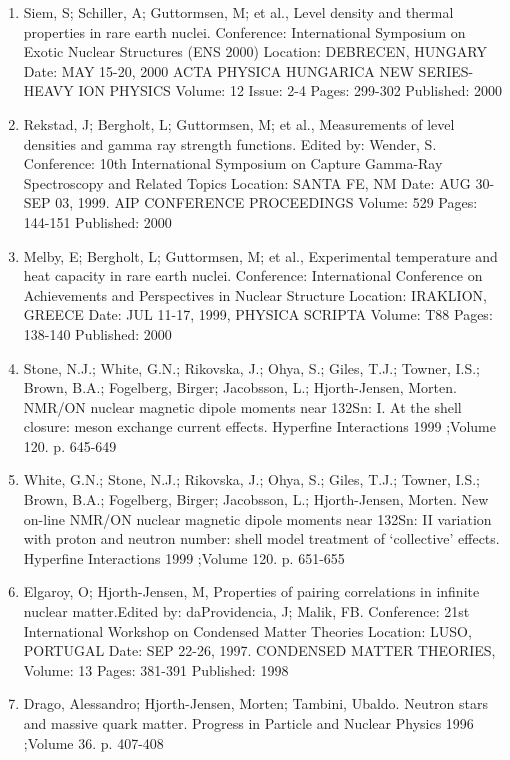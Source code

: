 \documentclass[a4wide,10pt]{article}
\begin{document}
\begin{enumerate}
\item Siem, S; Schiller, A; Guttormsen, M; et al., Level density and thermal properties in rare earth nuclei. Conference: International Symposium on Exotic Nuclear Structures (ENS 2000) Location: DEBRECEN, HUNGARY Date: MAY 15-20, 2000 ACTA PHYSICA HUNGARICA NEW SERIES-HEAVY ION PHYSICS  Volume: 12   Issue: 2-4   Pages: 299-302   Published: 2000

\item Rekstad, J; Bergholt, L; Guttormsen, M; et al., Measurements of level densities and gamma ray strength functions. Edited by: Wender, S. Conference: 10th International Symposium on Capture Gamma-Ray Spectroscopy and Related Topics Location: SANTA FE, NM Date: AUG 30-SEP 03, 1999. AIP CONFERENCE PROCEEDINGS   Volume: 529   Pages: 144-151   Published: 2000

\item Melby, E; Bergholt, L; Guttormsen, M; et al., Experimental temperature and heat capacity in rare earth nuclei. Conference: International Conference on Achievements and Perspectives in Nuclear Structure Location: IRAKLION, GREECE Date: JUL 11-17, 1999, PHYSICA SCRIPTA  Volume: T88   Pages: 138-140   Published: 2000

\item Stone, N.J.; White, G.N.; Rikovska, J.; Ohya, S.; Giles, T.J.; Towner, I.S.; Brown, B.A.; Fogelberg, Birger; Jacobsson, L.; Hjorth-Jensen, Morten.  NMR/ON nuclear magnetic dipole moments near 132Sn: I. At the shell closure: meson exchange current effects. Hyperfine Interactions 1999 ;Volume 120. p. 645-649

\item White, G.N.; Stone, N.J.; Rikovska, J.; Ohya, S.; Giles, T.J.; Towner, I.S.; Brown, B.A.; Fogelberg, Birger; Jacobsson, L.; Hjorth-Jensen, Morten.  New on-line NMR/ON nuclear magnetic dipole moments near 132Sn: II variation with proton and neutron number: shell model treatment of `collective' effects. Hyperfine Interactions 1999 ;Volume 120. p. 651-655

\item Elgaroy, O; Hjorth-Jensen, M, Properties of pairing correlations in infinite nuclear matter.Edited by: daProvidencia, J; Malik, FB. Conference: 21st International Workshop on Condensed Matter Theories Location: LUSO, PORTUGAL Date: SEP 22-26, 1997. CONDENSED MATTER THEORIES, Volume: 13   Pages: 381-391   Published: 1998

\item Drago, Alessandro; Hjorth-Jensen, Morten; Tambini, Ubaldo. Neutron stars and massive quark matter. Progress in Particle and Nuclear Physics 1996 ;Volume 36. p. 407-408


\end{enumerate}
\end{document}
